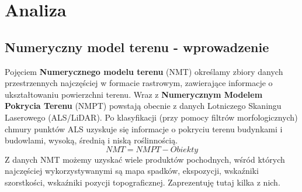 \documentclass[a4paper,11pt, onecolumn, openany]{memoir}
\begin{document}
\part{Analiza}
	\chapter{Numeryczny model terenu - wprowadzenie}
		Pojęciem \textbf{Numerycznego modelu terenu} (NMT) określamy zbiory danych przestrzennych najczęściej w formacie rastrowym, zawierające informacje o ukształtowaniu powierzchni terenu. Wraz z \textbf{Numerycznym Modelem Pokrycia Terenu} (NMPT) powstają obecnie z danych Lotniczego Skaningu Laserowego (ALS/LiDAR). Po klasyfikacji (przy pomocy filtrów morfologicznych) chmury punktów ALS uzyskuje się informacje o pokryciu terenu budynkami i budowlami, wysoką, średnią i niską roślinnością.
		\begin{equation}\label{rownanienmt}
		NMT = NMPT - Obiekty
		\end{equation}
		Z danych NMT możemy uzyskać wiele produktów pochodnych, wśród których najczęściej wykorzystywanymi są mapa spadków, ekspozycji, wskaźniki szorstkości, wskaźniki pozycji topograficznej. Zaprezentuję tutaj kilka z nich.
\end{document}
